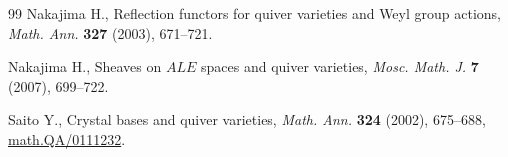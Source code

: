 \documentclass[10pt,a4paper]{amsart}
\theoremstyle{definition}
\numberwithin{equation}{section}
\begin{document}
\begin{thebibliography}{99}
Nakajima H.,  Ref\/lection functors for quiver varieties and {W}eyl group
  actions, {\it Math. Ann.} \textbf{327} (2003), 671--721.


Nakajima H.,  Sheaves on $ALE$ spaces and quiver varieties, {\it Mosc. Math. J.}
  \textbf{7} (2007),  699--722.


Saito Y., Crystal bases and quiver varieties, {\it Math. Ann.} \textbf{324}
  (2002),  675--688, \href{http://arxiv.org/abs/math.QA/0111232}{math.QA/0111232}. %



\end{thebibliography}
\end{document}
